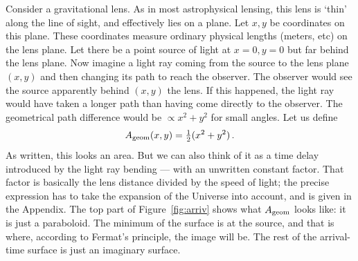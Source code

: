 \documentclass[12pt,preprint]{aastex}
\def\half{{\textstyle\frac12}}
\newcommand{\figref}[1]{Figure~\ref{fig:#1}}
\begin{document}
Consider a gravitational lens.  As in most astrophysical lensing, this
lens is `thin' along the line of sight, and effectively lies on a
plane.  Let $x,y$ be coordinates on this plane.  These coordinates
measure ordinary physical lengths (meters, etc) on the lens plane.
Let there be a point source of light at $x=0,y=0$ but far behind the
lens plane.  Now imagine a light ray coming from the source to the
lens plane $(x,y)$ and then changing its path to reach the observer.
The observer would see the source apparently behind $(x,y)$ the
lens.  If this happened, the light ray would have taken a longer path
than having come directly to the observer.  The geometrical path
difference would be $\propto x^2 + y^2$ for small angles.  Let us
define
\begin{equation} \label{eq:Ageom}
A_{\rm geom}(x,y) = \half(x^2 + y^2) \,.
\end{equation}
As written, this looks an area.  But we can also think of it as a
time delay introduced by the light ray bending --- with an unwritten
constant factor.  That factor is basically the lens distance divided by the
speed of light; the precise expression has to take the expansion of
the Universe into account, and is given in the Appendix.  The top part
of \figref{arriv} shows what $A_{\rm geom}$ looks like: it is
just a paraboloid.  The minimum of the surface is at the source, and
that is where, according to Fermat's principle, the image will be.
The rest of the arrival-time surface is just an imaginary surface.
\end{document}
